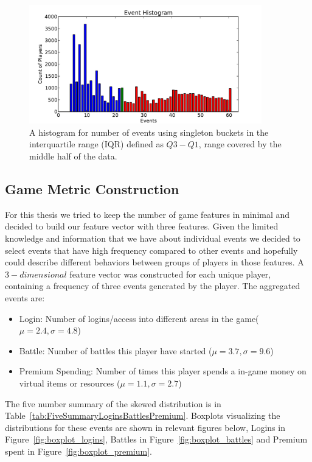 \begin{figure}[here]
\centerline{\includegraphics[width=0.9\textwidth]{Figures/histogram_events_iqr.pdf}}
\caption{A histogram for number of events using singleton buckets in the interquartile range (IQR) defined as $Q3 - Q1$, range covered by the middle half of the data.}
\label{fig:histogram_events_iqr}
\end{figure}


\subsection{Game Metric Construction}
For this thesis we tried to keep the number of game features in minimal and decided to build our feature vector with three features. Given the limited knowledge and information that we have about individual events we decided to select events that have high frequency compared to other events and hopefully could describe different behaviors between groups of players in those features. A $3-dimensional$ feature vector was constructed for each unique player, containing a frequency of three events generated by the player. The aggregated events are:
\begin{itemize}
\item Login: Number of logins/access into different areas in the game($\mu = 2.4, \sigma = 4.8$)
\item Battle: Number of battles this player have started ($\mu = 3.7, \sigma = 9.6$)
\item Premium Spending: Number of times this player spends a in-game money on virtual items or resources ($\mu = 1.1, \sigma = 2.7$) 
\end{itemize}

The five number summary of the skewed distribution is in Table~\ref{tab:FiveSummaryLoginsBattlesPremium}. Boxplots visualizing the distributions for these events are shown in relevant figures below, Logins in Figure~\ref{fig:boxplot_logins}, Battles in Figure~\ref{fig:boxplot_battles} and Premium spent in Figure~\ref{fig:boxplot_premium}.

